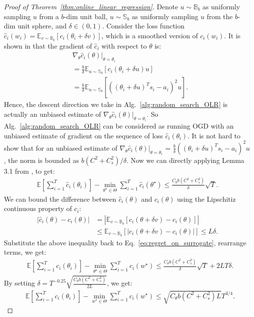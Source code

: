 \begin{proof}[Proof of Theorem~\ref{thm:online_linear_regression}]
Denote $u\sim \mathbb{B}_b$ as uniformly sampling $u$ from a $b$-dim unit ball, $u\sim\mathbb{S}_b$ as uniformly sampling $u$ from the $b$-dim unit sphere, and $\delta \in (0,1)$. Consider the loss function $\hat{c}_i(w_i) = \mathbb{E}_{v\sim \mathbb{B}_b}[c_i(\theta_i + \delta v)]$, which is a smoothed version of $c_i(w_i)$. It is shown in \cite{flaxman2005online} that the gradient of $\hat{c}_i$ with respect to $\theta$ is:
\begin{align*}
   &\nabla_{\theta}\hat{c}_i(\theta)|_{\theta = \theta_i} \\
   &= \frac{b}{\delta} \mathbb{E}_{u\sim\mathbb{S}_b}[c_i(\theta_i +\delta u)u]\\
   &= \frac{b}{\delta}\mathbb{E}_{u\sim \mathbb{S}_b}[((\theta_i +\delta u)^T s_i - a_i)^2 u].
\end{align*} Hence, the descent direction we take in Alg.~\ref{alg:random_search_OLR} is actually an unbiased estimate of $\nabla_{\theta}\hat{c}_i(\theta)|_{\theta=\theta_i}$. So Alg.~\ref{alg:random_search_OLR} can be considered as running OGD with an unbiased estimate of gradient on the sequence of loss $\hat{c}_i(\theta_i)$. It is not hard to show that for an unbiased estimate of $\nabla_{\theta}\hat{c}_i(\theta)|_{\theta=\theta_i}$ = $\frac{b}{\delta} ((\theta_i + \delta u)^T s_i - a_i)^2 u$, the norm is bounded as $b(C^2 + C_{s}^2)/\delta$. Now we can directly applying Lemma 3.1 from \cite{flaxman2005online}, to get:
\begin{align}
\label{eq:regret_on_surrogate}
   \mathbb{E}\left[\sum_{i=1}^T \hat{c}_i(\theta_i)\right] - \min_{\theta^\star\in{\Theta}}\sum_{i=1}^T \hat{c}_i(\theta^\star) \leq \frac{C_{\theta}b(C^2+C_{s}^2)}{\delta}\sqrt{T}.
\end{align} We can bound the difference between $\hat{c}_i(\theta)$ and ${c}_i(\theta)$ using the Lipschitiz continuous property of $c_i$:
\begin{align}
|\hat{c}_i(\theta) - c_i(\theta) | & = |\mathbb{E}_{v\sim \mathbb{B}_b}[c_i(\theta+\delta v) - c_i(\theta)]| \nonumber\\
&\leq \mathbb{E}_{v\sim \mathbb{B}_b}[|c_i(\theta+\delta v) - c_i(\theta)|] \leq L\delta.
\end{align} Substitute the above inequality back to Eq.~\ref{eq:regret_on_surrogate}, rearrange terms, we get:
\begin{align}
&\mathbb{E}\left[ \sum_{i=1}^T c_i(\theta_i)  \right]  - \min_{\theta^\star\in{\Theta}} \sum_{i=1}^T c_i(w^\star)\leq \frac{C_{\theta}b(C^2+C_{s}^2)}{\delta}\sqrt{T} + 2LT\delta.
\end{align} By setting $\delta = T^{-0.25}\sqrt{\frac{C_{\theta}b(C^2+C_{s}^2)}{2L}}$, we get:
\begin{align*}
   &\mathbb{E}\left[ \sum_{i=1}^T c_i(\theta_i)  \right]  - \min_{w^\star\in{\Theta}} \sum_{i=1}^T c_i(w^\star) \leq \sqrt{C_{\theta}b(C^2+C_{s}^2)L} T^{3/4}.
\end{align*}


\end{proof}
